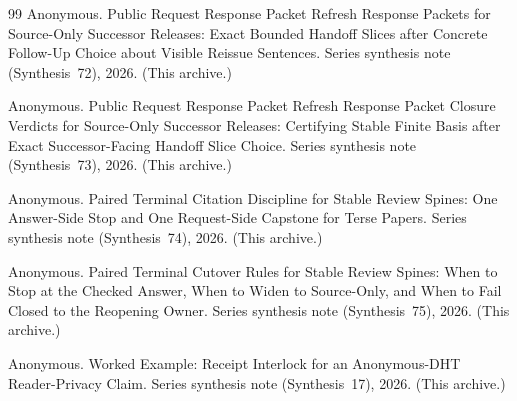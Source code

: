 \documentclass[11pt]{article}
\begin{document}
\begin{thebibliography}{99}
Anonymous.
\newblock Public Request Response Packet Refresh Response Packets for Source-Only Successor Releases: Exact Bounded Handoff Slices after Concrete Follow-Up Choice about Visible Reissue Sentences.
\newblock Series synthesis note (Synthesis~72), 2026. (This archive.)

Anonymous.
\newblock Public Request Response Packet Refresh Response Packet Closure Verdicts for Source-Only Successor Releases: Certifying Stable Finite Basis after Exact Successor-Facing Handoff Slice Choice.
\newblock Series synthesis note (Synthesis~73), 2026. (This archive.)

Anonymous.
\newblock Paired Terminal Citation Discipline for Stable Review Spines: One Answer-Side Stop and One Request-Side Capstone for Terse Papers.
\newblock Series synthesis note (Synthesis~74), 2026. (This archive.)

Anonymous.
\newblock Paired Terminal Cutover Rules for Stable Review Spines: When to Stop at the Checked Answer, When to Widen to Source-Only, and When to Fail Closed to the Reopening Owner.
\newblock Series synthesis note (Synthesis~75), 2026. (This archive.)

Anonymous.
\newblock Worked Example: Receipt Interlock for an Anonymous-DHT Reader-Privacy Claim.
\newblock Series synthesis note (Synthesis~17), 2026. (This archive.)

\end{thebibliography}
\end{document}
